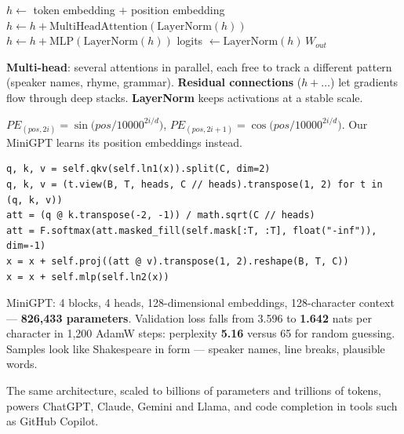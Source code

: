 \documentclass[11pt,a4paper]{article}
\begin{document}
\begin{balgo}
\begin{algorithmic}[1]
\State $h\gets$ token embedding $+$ position embedding
  \State $h\gets h+\mathrm{MultiHeadAttention}(\mathrm{LayerNorm}(h))$ 
  \State $h\gets h+\mathrm{MLP}(\mathrm{LayerNorm}(h))$ 
\EndFor
\State logits $\gets\mathrm{LayerNorm}(h)\,W_{out}$ 
\end{algorithmic}
\end{balgo}
\begin{bdef}
\textbf{Multi-head}: several attentions in parallel, each free to track a different pattern (speaker names, rhyme, grammar). \textbf{Residual connections} ($h+\dots$) let gradients flow through deep stacks. \textbf{LayerNorm} keeps activations at a stable scale.
\end{bdef}
\begin{bmath}
$PE_{(pos,2i)}=\sin\!\big(pos/10000^{2i/d}\big)$, \;$PE_{(pos,2i+1)}=\cos\!\big(pos/10000^{2i/d}\big)$. Our MiniGPT learns its position embeddings instead.
\end{bmath}
\begin{bcode}
\begin{lstlisting}
q, k, v = self.qkv(self.ln1(x)).split(C, dim=2)
q, k, v = (t.view(B, T, heads, C // heads).transpose(1, 2) for t in (q, k, v))
att = (q @ k.transpose(-2, -1)) / math.sqrt(C // heads)
att = F.softmax(att.masked_fill(self.mask[:T, :T], float("-inf")), dim=-1)
x = x + self.proj((att @ v).transpose(1, 2).reshape(B, T, C))
x = x + self.mlp(self.ln2(x))
\end{lstlisting}
\end{bcode}
\begin{bres}
MiniGPT: 4 blocks, 4 heads, 128-dimensional embeddings, 128-character context --- \textbf{826,433 parameters}. Validation loss falls from 3.596 to \textbf{1.642} nats per character in 1,200 AdamW steps: perplexity \textbf{5.16} versus 65 for random guessing. Samples look like Shakespeare in form --- speaker names, line breaks, plausible words.
\end{bres}
\begin{bapp}
The same architecture, scaled to billions of parameters and trillions of tokens, powers ChatGPT, Claude, Gemini and Llama, and code completion in tools such as GitHub Copilot.
\end{bapp}
\end{document}

